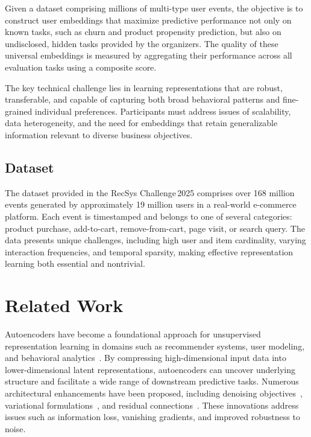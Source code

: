 \documentclass[sigconf]{acmart}
\begin{document}
Given a dataset comprising millions of multi-type user events, the objective is to construct user embeddings that maximize predictive performance not only on known tasks, such as churn and product propensity prediction, but also on undisclosed, hidden tasks provided by the organizers. The quality of these universal embeddings is measured by aggregating their performance across all evaluation tasks using a composite score.

The key technical challenge lies in learning representations that are robust, transferable, and capable of capturing both broad behavioral patterns and fine-grained individual preferences. Participants must address issues of scalability, data heterogeneity, and the need for embeddings that retain generalizable information relevant to diverse business objectives.
\subsection{Dataset}
The dataset provided in the RecSys Challenge 2025 comprises over 168 million events generated by approximately 19 million users in a real-world e-commerce platform. Each event is timestamped and belongs to one of several categories: product purchase, add-to-cart, remove-from-cart, page visit, or search query. The data presents unique challenges, including high user and item cardinality, varying interaction frequencies, and temporal sparsity, making effective representation learning both essential and nontrivial.

\label{sec:related}
\section{Related Work}

Autoencoders have become a foundational approach for unsupervised representation learning in domains such as recommender systems, user modeling, and behavioral analytics~\cite{Hinton2006, Vincent2008, Kingma2014, Sedhain2015}. By compressing high-dimensional input data into lower-dimensional latent representations, autoencoders can uncover underlying structure and facilitate a wide range of downstream predictive tasks. Numerous architectural enhancements have been proposed, including denoising objectives~\cite{Vincent2008}, variational formulations~\cite{Kingma2014}, and residual connections~\cite{He2016ResNet, Mao2016}. These innovations address issues such as information loss, vanishing gradients, and improved robustness to noise.
\end{document}
